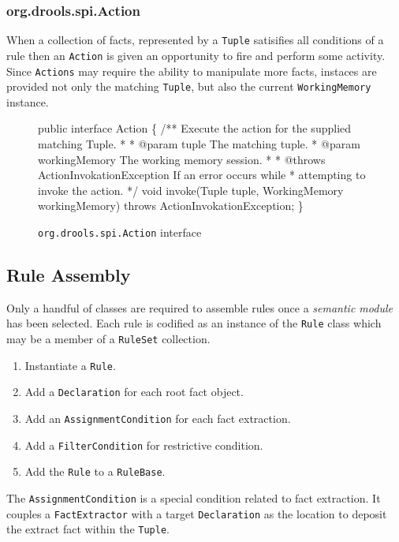 \subsubsection{org.drools.spi.Action}

When a collection of facts, represented by a \verb|Tuple| satisifies
all conditions of a rule then an \verb|Action| is given an opportunity
to fire and perform some activity.  Since \verb|Actions| may require
the ability to manipulate more facts, instaces are provided not only
the matching \verb|Tuple|, but also the current \verb|WorkingMemory|
instance.

\begin{figure}
\begin{codelisting}
public interface Action
\{
    /** Execute the action for the supplied matching Tuple.
     *
     *  @param tuple The matching tuple.
     *  @param workingMemory The working memory session.
     *
     *  @throws ActionInvokationException If an error occurs while
     *          attempting to invoke the action.
     */
    void invoke(Tuple tuple,
                WorkingMemory workingMemory) throws ActionInvokationException;
\}
\end{codelisting}
\label{code.Action}
\caption{\texttt{org.drools.spi.Action} interface}
\end{figure}

\newpage

\subsection{Rule Assembly}

Only a handful of classes are required to assemble rules once a
\emph{semantic module} has been selected.  Each rule is codified as an
instance of the \verb|Rule| class which may be a member of a
\verb|RuleSet| collection.  

\begin{enumerate}
	\item Instantiate a \verb|Rule|.
	\item Add a \verb|Declaration| for each root fact object.
	\item Add an \verb|AssignmentCondition| for each fact extraction.
	\item Add a \verb|FilterCondition| for restrictive condition.
	\item Add the \verb|Rule| to a \verb|RuleBase|.
\end{enumerate}

The \verb|AssignmentCondition| is a special condition related to
fact extraction.  It couples a \verb|FactExtractor| with a target
\verb|Declaration| as the location to deposit the extract fact
within the \verb|Tuple|.

